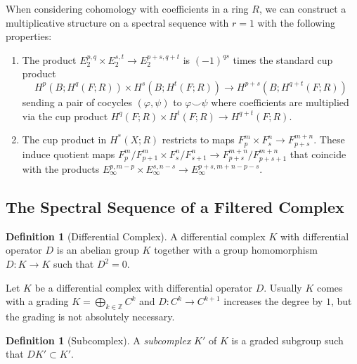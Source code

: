 \documentclass[reqno]{amsart}
\theoremstyle{definition}
\newtheorem{definition}[theorem]{Definition}
\theoremstyle{remark}
\begin{document}
When considering cohomology with
coefficients in a ring $R$, we can
construct a multiplicative structure on a spectral sequence
with $r = 1$
with the following properties:
\begin{enumerate}
    \item The product
        $E_2^{p,q} \times E_2^{s,t} \to 
        E_2^{p+s,q+t}$ is
        $(-1)^{qs}$ times the standard cup product
        \[
        H^{p}(B; H^{q}(F;R)) \times H^{s}(B;
        H^{t}(F;R)) \to H^{p+s}(B;H^{q+t}(F;R))
        \] 
        sending a pair of cocycles
        $\left( \varphi , \psi  \right) $ to
        $\varphi \smile \psi $ where coefficients
        are multiplied via the cup product
        $H^{q}(F;R) \times H^{t}(F;R) \to H^{q+t}(F;R)$.
    \item The cup product in $H^{*}(X;R)$ restricts
        to  maps $F_p^{m} \times F_s^{n} \to F_{p+s}^{m+n}$.
        These induce quotient maps 
        $F_p^{m} / F_{p+1}^{m} \times F_s^{n} / F_{s+1}^{n} \to 
        F_{p+s}^{m+n} / F_{p+s+1}^{m+n}$ that coincide
        with the products
        $E_{\infty}^{p,m-p} \times E_{\infty}^{s,n-s} \to 
        E_{\infty}^{p+s, m+n-p-s}$.
\end{enumerate}






\newpage




\subsection{The Spectral Sequence of a Filtered
Complex}

\begin{definition}[Differential Complex]
    A differential complex $K$ with differential operator
    $D$ is an abelian group $K$ together with
    a group homomorphism $D \colon K \to K$ such that
    $D^2 = 0$.
\end{definition}

Let $K$ be a differential complex with differential operator
$D$.
Usually $K$ comes with a grading
$K = \bigoplus_{k \in \mathbb{Z}}C^{k}$ and
$D \colon C^{k} \to C^{k+1}$ increases the
degree by $1$, but the grading is not
absolutely necessary.

\begin{definition}[Subcomplex]
    A \textit{subcomplex} $K'$ of $K$ is a
    graded subgroup such that $DK' \subset 
    K'$.
\end{definition}
\end{document}

